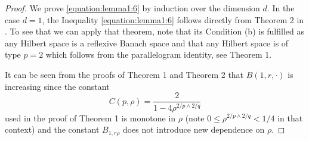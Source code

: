 \begin{proof}
    We prove \eqref{equation:lemma1:6} by induction over the dimension $d$. In the case $d=1$, the Inequality \eqref{equation:lemma1:6} follows directly from Theorem 2 in \cite{[56]zhang1998rosenthal}. To see that we can apply that theorem, note that its Condition (b) is fulfilled as any Hilbert space is a reflexive Banach space %
    and that any Hilbert space is of type $p=2$ which follows from the parallelogram identity, see \cite{jordan1935innerproduct} Theorem 1.
    
    It can be seen from the proofs of \cite{[56]zhang1998rosenthal} Theorem 1 and Theorem 2 that $B(1, r, \cdot)$ is increasing since the constant 
    \[ C(p, \rho) = \frac{2}{1-4\rho^{2/p \wedge 2/q}} \]
    used in the proof of \cite{[56]zhang1998rosenthal} Theorem 1 is monotone in $\rho$ (note $0 \leq \rho^{2/p \wedge 2/q} < 1/4$ in that context) and the constant $B_{1, r \rho}$ does not introduce new dependence on $\rho$.


\end{proof}
